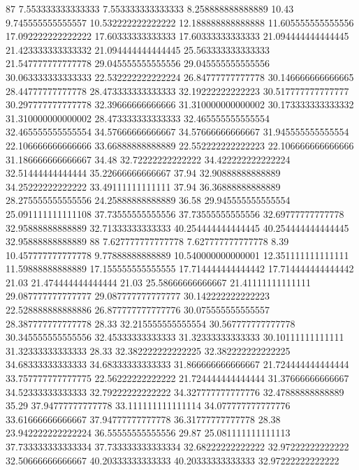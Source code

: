 87 7.553333333333333 7.553333333333333 8.258888888888889 10.43 9.745555555555557 10.532222222222222 12.188888888888888 11.605555555555556 17.092222222222222 17.60333333333333 17.60333333333333 21.094444444444445 21.423333333333332 21.094444444444445 25.563333333333333 21.547777777777778 29.045555555555556 29.045555555555556 30.063333333333333 22.532222222222224 26.84777777777778 30.146666666666665 28.44777777777778 28.473333333333333 32.19222222222223 30.517777777777777 30.297777777777778 32.39666666666666 31.310000000000002 30.173333333333332 31.310000000000002 28.473333333333333 32.465555555555554 32.465555555555554 34.57666666666667 34.57666666666667 31.945555555555554 22.106666666666666 33.66888888888889 22.552222222222223 22.106666666666666 31.186666666666667 34.48 32.72222222222222 34.422222222222224 32.51444444444444 35.22666666666667 37.94 32.90888888888889 34.25222222222222 33.49111111111111 37.94 36.36888888888889 28.275555555555556 24.25888888888889 36.58 29.945555555555554 25.091111111111108 37.73555555555556 37.73555555555556 32.69777777777778 32.95888888888889 32.71333333333333 40.254444444444445 40.254444444444445 32.95888888888889
88 7.627777777777778 7.627777777777778 8.39 10.457777777777778 9.77888888888889 10.540000000000001 12.351111111111111 11.59888888888889 17.155555555555555 17.714444444444442 17.714444444444442 21.03 21.474444444444444 21.03 25.58666666666667 21.41111111111111 29.087777777777777 29.087777777777777 30.142222222222223 22.528888888888886 26.877777777777776 30.075555555555557 28.387777777777778 28.33 32.215555555555554 30.567777777777778 30.345555555555556 32.45333333333333 31.32333333333333 30.10111111111111 31.32333333333333 28.33 32.382222222222225 32.382222222222225 34.68333333333333 34.68333333333333 31.866666666666667 21.724444444444444 33.757777777777775 22.56222222222222 21.724444444444444 31.37666666666667 34.52333333333333 32.79222222222222 34.327777777777776 32.47888888888889 35.29 37.94777777777778 33.111111111111114 34.077777777777776 33.61666666666667 37.94777777777778 36.31777777777778 28.38 23.942222222222224 36.55555555555556 29.87 25.081111111111113 37.733333333333334 37.733333333333334 32.68222222222222 32.97222222222222 32.50666666666667 40.20333333333333 40.20333333333333 32.97222222222222
